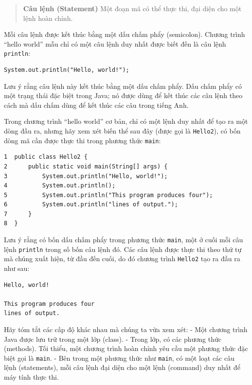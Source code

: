 \begin{quote}
\textbf{Câu lệnh (Statement)} Một đoạn mã có thể thực thi, đại diện cho
một lệnh hoàn chỉnh.
\end{quote}

Mỗi câu lệnh được kết thúc bằng một dấu chấm phẩy (semicolon). Chương
trình ``hello world'' mẫu chỉ có một câu lệnh duy nhất được biết đến là
câu lệnh \texttt{println}:

\begin{verbatim}
System.out.println("Hello, world!");
\end{verbatim}

Lưu ý rằng câu lệnh này kết thúc bằng một dấu chấm phẩy. Dấu chấm phẩy
có một trạng thái đặc biệt trong Java; nó được dùng để kết thúc các câu
lệnh theo cách mà dấu chấm dùng để kết thúc các câu trong tiếng Anh.

Trong chương trình ``hello world'' cơ bản, chỉ có một lệnh duy nhất để
tạo ra một dòng đầu ra, nhưng hãy xem xét biến thể sau đây (được gọi là
\texttt{Hello2}), có bốn dòng mã cần được thực thi trong phương thức
\texttt{main}:

\begin{verbatim}
1  public class Hello2 {
2      public static void main(String[] args) {
3          System.out.println("Hello, world!");
4          System.out.println();
5          System.out.println("This program produces four");
6          System.out.println("lines of output.");
7      }
8  }
\end{verbatim}

Lưu ý rằng có bốn dấu chấm phẩy trong phương thức \texttt{main}, một ở
cuối mỗi câu lệnh \texttt{println} trong số bốn câu lệnh đó. Các câu
lệnh được thực thi theo thứ tự mà chúng xuất hiện, từ đầu đến cuối, do
đó chương trình \texttt{Hello2} tạo ra đầu ra như sau:

\begin{verbatim}
Hello, world! 

This program produces four 
lines of output.
\end{verbatim}

Hãy tóm tắt các cấp độ khác nhau mà chúng ta vừa xem xét: - Một chương
trình Java được lưu trữ trong một lớp (class). - Trong lớp, có các
phương thức (methods). Tối thiểu, một chương trình hoàn chỉnh yêu cầu
một phương thức đặc biệt gọi là \texttt{main}. - Bên trong một phương
thức như \texttt{main}, có một loạt các câu lệnh (statements), mỗi câu
lệnh đại diện cho một lệnh (command) duy nhất để máy tính thực thi.

